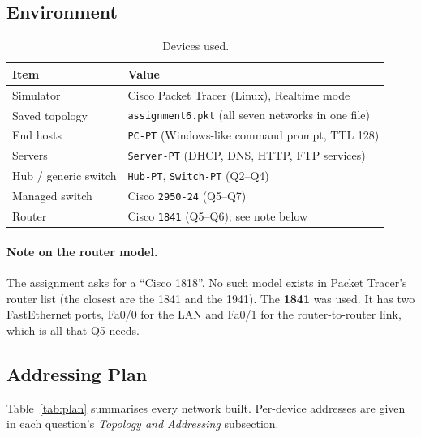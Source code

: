 \documentclass[11pt]{article}
\begin{document}
\subsection{Environment}
\begin{table}[H]
\centering
\begin{tabular}{ll}
\toprule
\textbf{Item} & \textbf{Value} \\
\midrule
Simulator & Cisco Packet Tracer (Linux), Realtime mode \\
Saved topology & \texttt{assignment6.pkt} (all seven networks in one file) \\
End hosts & \texttt{PC-PT} (Windows-like command prompt, TTL 128) \\
Servers & \texttt{Server-PT} (DHCP, DNS, HTTP, FTP services) \\
Hub / generic switch & \texttt{Hub-PT}, \texttt{Switch-PT} (Q2--Q4) \\
Managed switch & Cisco \texttt{2950-24} (Q5--Q7) \\
Router & Cisco \texttt{1841} (Q5--Q6); see note below \\
\bottomrule
\end{tabular}
\caption{Devices used.}
\end{table}

\paragraph{Note on the router model.} The assignment asks for a ``Cisco 1818''. No such
model exists in Packet Tracer's router list (the closest are the 1841 and the 1941). The
\textbf{1841} was used. It has two FastEthernet ports, Fa0/0 for the LAN and Fa0/1 for
the router-to-router link, which is all that Q5 needs.

\subsection{Addressing Plan}
Table~\ref{tab:plan} summarises every network built. Per-device addresses are given in each
question's \emph{Topology and Addressing} subsection.
\end{document}
